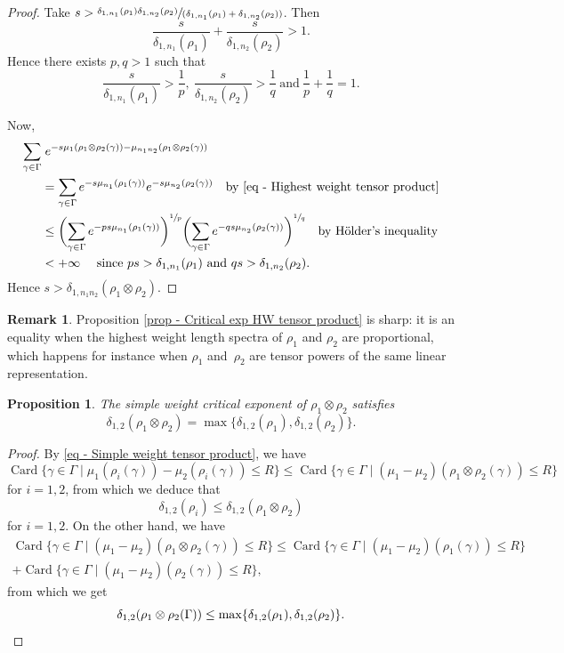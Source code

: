 \documentclass[JEP,XML,SOM,Unicode,NoEqCountersInSection,NoFloatCountersInSection,published]{cedram}
\newcommand{\spfrac}[2]{\sfrac{#1}{(#2)}}
\newtheorem{prop}[theo]{Proposition}
\theoremstyle{definition}
\newtheorem{rmk}[theo]{Remark}
\DeclareMathOperator{\Card}{Card}
\let\G\Gamma
\let\g\gamma
\begin{document}
\begin{proof}
Take $s> \spfrac{\delta_{1,n_1}(\rho_1) \delta_{1,n_2}(\rho_2)}{\delta_{1,n_1}(\rho_1) +\delta_{1,n_2}(\rho_2)}$. Then
\[\frac{s}{\delta_{1,n_1}(\rho_1)}+ \frac{s}{\delta_{1,n_2}(\rho_2)} > 1.\]
Hence there exists $p,q>1$ such that
\[\frac{s}{\delta_{1,n_1}(\rho_1)} > \frac{1}{p},~\frac{s}{\delta_{1,n_2}(\rho_2)} > \frac{1}{q}~\textrm{and}~ \frac{1}{p}+\frac{1}{q}=1.\]

Now,
\begin{align*}
\sum_{\gamma\in \G} &\;e^{-s \mu_1(\rho_1\otimes \rho_2(\gamma)) - \mu_{n_1n_2}(\rho_1\otimes \rho_2(\gamma))}\\
&= \sum_{\gamma \in \Gamma} e^{-s \mu_{n_1}(\rho_1(\gamma))} e^{-s \mu_{n_2}(\rho_2(\gamma))} \quad \textrm{by \eqref{eq - Highest weight tensor product}} \\
&\leq \biggl(\sum_{\gamma\in \Gamma} e^{-ps \mu_{n_1}(\rho_1(\gamma))}\biggr)^{\sfrac{1}{p}}\biggl(\sum_{\gamma\in \Gamma} e^{-qs \mu_{n_2}(\rho_2(\gamma))}\biggr)^{\sfrac{1}{q}} \quad \textrm{by Hölder's inequality}\\
& < +\infty \quad \textrm{ since $ps> \delta_{1,n_1}(\rho_1)$ and $qs > \delta_{1,n_2}(\rho_2)$.}
\end{align*}
Hence $s> \delta_{1,n_1n_2}(\rho_1\otimes \rho_2)$.
\end{proof}

\begin{rmk}
Proposition \ref{prop - Critical exp HW tensor product} is sharp: it is an equality when the highest weight length spectra of $\rho_1$ and $\rho_2$ are proportional, which happens for instance when $\rho_1$ and~$\rho_2$ are tensor powers of the same linear representation.
\end{rmk}

\begin{prop} \label{prop - Critical exp SW tensor product}
The simple weight critical exponent of $\rho_1\otimes \rho_2$ satisfies
\[\delta_{1,2}(\rho_1\otimes \rho_2) = \max \{\delta_{1,2}(\rho_1), \delta_{1,2}(\rho_2)\}.\]
\end{prop}

\begin{proof}
By \eqref{eq - Simple weight tensor product}, we have
\[\Card \{\gamma \in \G \mid \mu_1(\rho_i(\gamma))-\mu_2(\rho_i(\gamma)) \leq R\} \leq \Card \{\g \in \G \mid (\mu_1 - \mu_2)(\rho_1\otimes \rho_2(\g)) \leq R\}\]
for $i=1,2$, from which we deduce that
\[\delta_{1,2}(\rho_i) \leq \delta_{1,2}(\rho_1\otimes \rho_2)\] for $i= 1,2$. On the other hand, we have
\begin{multline*}\Card \{\g \in \G \mid (\mu_1 - \mu_2)(\rho_1\otimes \rho_2(\g)) \leq R\} \leq \Card \{\g \in \G \mid (\mu_1-\mu_2)(\rho_1(\g)) \leq R\}\\
+ \Card \{\g \in \G \mid (\mu_1-\mu_2)(\rho_2(\g)) \leq R\},
\end{multline*}
from which we get
\[\delta_{1,2}(\rho_1\otimes \rho_2(\Gamma)) \leq \max \{\delta_{1,2}(\rho_1), \delta_{1,2}(\rho_2)\}.\qedhere\]
\end{proof}
\end{document}
